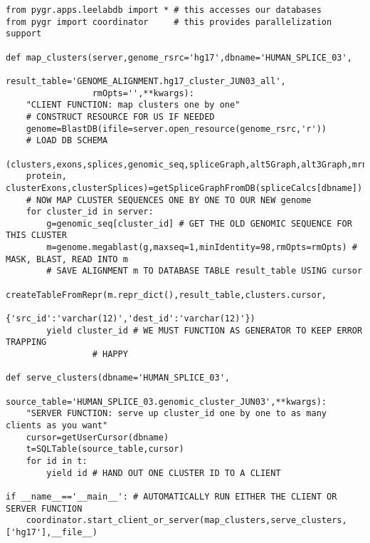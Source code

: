\documentclass{howto}
\begin{document}
\begin{verbatim}
from pygr.apps.leelabdb import * # this accesses our databases
from pygr import coordinator     # this provides parallelization support

def map_clusters(server,genome_rsrc='hg17',dbname='HUMAN_SPLICE_03',
                 result_table='GENOME_ALIGNMENT.hg17_cluster_JUN03_all',
                 rmOpts='',**kwargs):
    "CLIENT FUNCTION: map clusters one by one"
    # CONSTRUCT RESOURCE FOR US IF NEEDED
    genome=BlastDB(ifile=server.open_resource(genome_rsrc,'r'))
    # LOAD DB SCHEMA
    (clusters,exons,splices,genomic_seq,spliceGraph,alt5Graph,alt3Graph,mrna, 
    protein, clusterExons,clusterSplices)=getSpliceGraphFromDB(spliceCalcs[dbname])
    # NOW MAP CLUSTER SEQUENCES ONE BY ONE TO OUR NEW genome
    for cluster_id in server:
        g=genomic_seq[cluster_id] # GET THE OLD GENOMIC SEQUENCE FOR THIS CLUSTER
        m=genome.megablast(g,maxseq=1,minIdentity=98,rmOpts=rmOpts) # MASK, BLAST, READ INTO m
        # SAVE ALIGNMENT m TO DATABASE TABLE result_table USING cursor
        createTableFromRepr(m.repr_dict(),result_table,clusters.cursor,
                            {'src_id':'varchar(12)','dest_id':'varchar(12)'})
        yield cluster_id # WE MUST FUNCTION AS GENERATOR TO KEEP ERROR TRAPPING 
		         # HAPPY

def serve_clusters(dbname='HUMAN_SPLICE_03',
                   source_table='HUMAN_SPLICE_03.genomic_cluster_JUN03',**kwargs):
    "SERVER FUNCTION: serve up cluster_id one by one to as many clients as you want"
    cursor=getUserCursor(dbname)
    t=SQLTable(source_table,cursor)
    for id in t:
        yield id # HAND OUT ONE CLUSTER ID TO A CLIENT

if __name__=='__main__': # AUTOMATICALLY RUN EITHER THE CLIENT OR SERVER FUNCTION
    coordinator.start_client_or_server(map_clusters,serve_clusters,['hg17'],__file__)
\end{verbatim}
\end{document}
